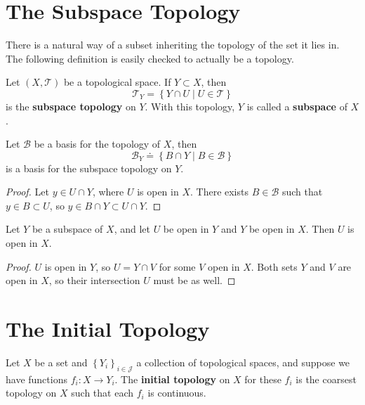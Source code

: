 \documentclass[10pt]{report}
\begin{document}

\section{The Subspace Topology}

There is a natural way of a subset inheriting the topology of the set it lies in. The following definition is easily checked to actually be a topology.

\begin{defn}
	Let $(X,\mathcal{T})$ be a topological space. If $Y \subset X$, then
	\[
	\mathcal{T}_Y = \left\{ Y \cap U \;|\; U \in \mathcal{T} \right\}
	\] is the \textbf{subspace topology} on $Y$. With this topology, $Y$ is called a \textbf{subspace} of $X$.
\end{defn}

\begin{prop}
Let $\mathcal{B}$ be a basis for the topology of $X$, then \[\mathcal{B}_Y \doteq \left\{ B \cap Y \;|\; B \in \mathcal{B} \right\}\] is a basis for the subspace topology on $Y$.
\end{prop}
\begin{proof}
	Let $y \in U \cap Y$, where $U$ is open in $X$. There exists $B \in \mathcal{B}$ such that $y \in B \subset U$, so $y \in B \cap Y \subset U \cap Y$.
\end{proof}

\begin{prop}
	Let $Y$ be a subspace of $X$, and let $U$ be open in $Y$ and $Y$ be open in $X$. Then $U$ is open in $X$.
\end{prop}
\begin{proof}
	$U$ is open in $Y$, so $U=Y \cap V$ for some $V$ open in $X$. Both sets $Y$ and $V$ are open in $X$, so their intersection $U$ must be as well.
\end{proof}



\section{The Initial Topology}

\begin{defn}[]
Let $X$ be a set and $\left\{ Y_i \right\}_{i \in \mathcal{J}}$ a collection of topological spaces, and suppose we have functions $f_i: X\to Y_i$. The \textbf{initial topology} on $X$ for these $f_i$ is the coarsest topology on $X$ such that each $f_i$ is continuous.
\end{defn}
\end{document}
